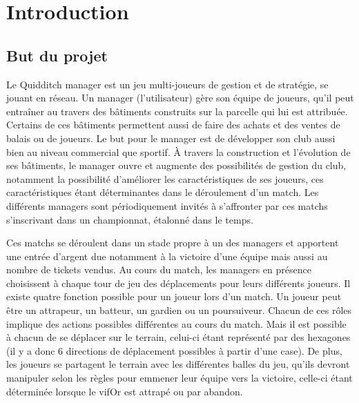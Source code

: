 \documentclass[a4paper,titlepage]{scrreprt}
\begin{document}
\tableofcontents
\chapter{Introduction}
\section{But du projet}
  Le \gls{Quidditch} \gls{manager} est un jeu multi-joueurs de gestion
  et de stratégie, se jouant en réseau.
  Un manager (l'utilisateur) gère son équipe de \gls{joueur}s, qu'il peut entraîner
  au travers des bâtiments construits sur la parcelle qui lui est attribuée. Certains de ces bâtiments permettent aussi de faire des achats et des ventes de balais ou de joueurs.
  Le but pour le manager est de développer son \gls{club} aussi bien au niveau commercial
  que sportif.
  À travers la construction et l'évolution de ses bâtiments, le manager ouvre et
  augmente des possibilités de gestion du club, notamment la possibilité
  d'améliorer les caractéristiques de ses joueurs, ces caractéristiques
  étant déterminantes dans le déroulement d'un match.
  Les différents managers sont périodiquement invités à s'affronter par
  ces \gls{match}s s'inscrivant dans un championnat, étalonné dans le temps. 
  
  Ces matchs se déroulent
  dans un stade propre à un des managers et apportent une entrée d'argent
  due notamment à la victoire d'une équipe mais aussi au nombre de tickets vendus.
  Au cours du match, les managers en présence choisissent à chaque tour de jeu
  des déplacements pour leurs différents joueurs. Il existe quatre fonction possible
  pour un joueur lors d'un match. Un joueur peut être un \gls{attrapeur}, un \gls{batteur}, un \gls{gardien}
  ou un \gls{poursuiveur}.
  Chacun de ces rôles implique des actions possibles différentes au cours du match.
  Mais il est possible à chacun de se déplacer sur le terrain, celui-ci étant représenté par
  des hexagones (il y a donc 6 directions de déplacement possibles à partir d'une case).
  De plus, les joueurs se partagent le terrain avec les différentes balles du jeu, 
  qu'ils devront manipuler selon les règles pour emmener leur équipe vers la victoire,
  celle-ci étant déterminée lorsque le \gls{vifOr} est attrapé ou par abandon.
\end{document}
